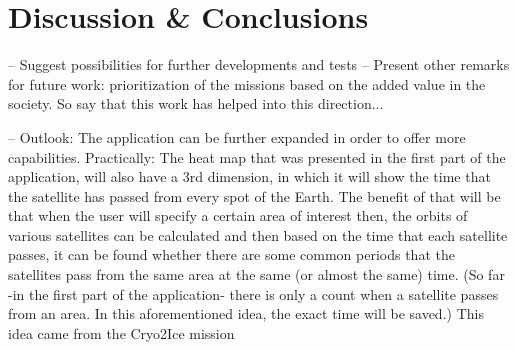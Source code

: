 \chapter{Discussion \& Conclusions}
\label{chap:5}

--  Suggest possibilities for further developments and tests
--  Present other remarks for future work: prioritization of the missions based on the added value in the society. So say that this work has helped into this direction...

-- Outlook:
The application can be further expanded in order to offer more capabilities. Practically: The heat map that was presented in the first part of the application, will also have a 3rd dimension, in which it will show the time that the satellite has passed from every spot of the Earth. The benefit of that will be that when the user will specify a certain area of interest then, the orbits of various satellites can be calculated and then based on the time that each satellite passes, it can be found whether there are some common periods that the satellites pass from the same area at the same (or almost the same) time. 
(So far -in the first part of the application- there is only a count when a satellite passes from an area. In this aforementioned idea, the exact time will be saved.)
This idea came from the Cryo2Ice mission %